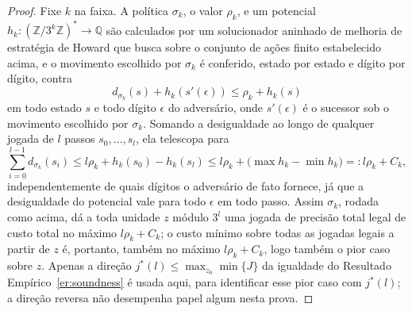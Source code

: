 \documentclass[11pt]{amsart}
\theoremstyle{plain}
\theoremstyle{definition}
\theoremstyle{remark}
\newcommand{\Z}{\mathbb{Z}}
\newcommand{\Q}{\mathbb{Q}}
\begin{document}
\begin{proof}
Fixe $k$ na faixa. A política $\sigma_k$, o valor $\rho_k$, e um potencial
$h_k:(\Z/3^k\Z)^*\to\Q$ são calculados por um solucionador aninhado de melhoria de estratégia de
Howard que busca sobre o conjunto de ações finito estabelecido acima, e o movimento escolhido por
$\sigma_k$ é conferido, estado por estado e dígito por dígito, contra
\[
d_{\sigma_k}(s) + h_k(s'(\epsilon)) \le \rho_k + h_k(s)
\]
em todo estado $s$ e todo dígito $\epsilon$ do adversário, onde $s'(\epsilon)$ é o sucessor sob o
movimento escolhido por $\sigma_k$. Somando a desigualdade ao longo de qualquer jogada de $l$
passos $s_0,\dots,s_l$, ela telescopa para
\[
\sum_{i=0}^{l-1} d_{\sigma_k}(s_i) \le l\rho_k + h_k(s_0) - h_k(s_l) \le l\rho_k + \bigl(\max h_k -
\min h_k\bigr) =: l\rho_k + C_k,
\]
independentemente de quais dígitos o adversário de fato fornece, já que a desigualdade do potencial
vale para todo $\epsilon$ em todo passo. Assim $\sigma_k$, rodada como acima, dá a toda unidade $z$
módulo $3^l$ uma jogada de precisão total legal de custo total no máximo $l\rho_k+C_k$; o custo
mínimo sobre todas as jogadas legais a partir de $z$ é, portanto, também no máximo $l\rho_k+C_k$,
logo também o pior caso sobre $z$. Apenas a direção
$j^*(l)\le\max_{z_0}\min\{J\}$ da igualdade do Resultado Empírico~\ref{er:soundness} é usada aqui,
para identificar esse pior caso com $j^*(l)$; a direção reversa não desempenha papel algum nesta
prova.
\end{proof}
\end{document}
